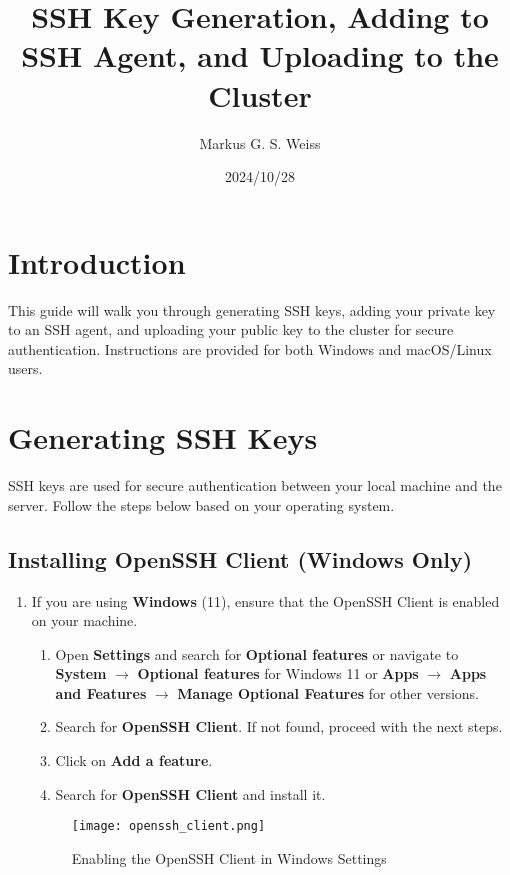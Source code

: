 \documentclass[12pt,letterpaper]{article}
\begin{document}
\title{\LARGE SSH Key Generation, Adding to SSH Agent, and Uploading to the Cluster}
\author{Markus G. S. Weiss}
\date{2024/10/28}
\maketitle

\tableofcontents
\newpage
\section{Introduction}

This guide will walk you through generating SSH keys, adding your private key to an SSH agent, and uploading your public key to the cluster for secure authentication. Instructions are provided for both Windows and macOS/Linux users.

\section{Generating SSH Keys}

SSH keys are used for secure authentication between your local machine and the server. Follow the steps below based on your operating system.

\subsection{Installing OpenSSH Client (Windows Only)}

\begin{enumerate}
    \item If you are using \textbf{Windows} (11), ensure that the OpenSSH Client is enabled on your machine.
    \begin{enumerate}
        \item Open \textbf{Settings} and search for \textbf{Optional features} or navigate to \textbf{System} $\rightarrow$ \textbf{Optional features} for Windows 11 or \textbf{Apps} $\rightarrow$ \textbf{Apps and Features} $\rightarrow$ \textbf{Manage Optional Features} for other versions.
        \item Search for \textbf{OpenSSH Client}. If not found, proceed with the next steps.
        \item Click on \textbf{Add a feature}.
        \item Search for \textbf{OpenSSH Client} and install it.
    \end{enumerate}

    \begin{figure}[H]
        \centering
        \texttt{[image: openssh\_client.png]}
        \caption{Enabling the OpenSSH Client in Windows Settings}
        \label{fig:openssh_client}
    \end{figure}
\end{enumerate}
\end{document}
